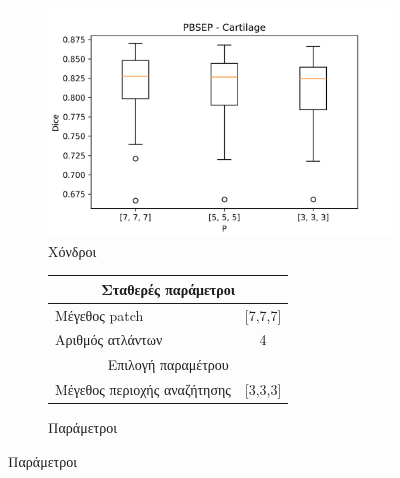 \documentclass{beamer}
\begin{document}
\begin{frame}
\begin{figure}[H]
    \begin{subfigure}[b]{0.42\linewidth}
    \includegraphics[width=\linewidth]{PBSEP_P_Cartilage_plot.png}
    \caption{Χόνδροι}
    \end{subfigure}
    \begin{subfigure}[b]{0.42\linewidth}
        \begin{tabular}[t]{|l|c|} 
            \multicolumn{2}{c}{\footnotesize Σταθερές παράμετροι} \\
            \hline
            \footnotesize Μέγεθος patch & \footnotesize [7,7,7] \\
            \hline
            \footnotesize Αριθμός ατλάντων & \footnotesize 4 \\ 
            \hline
            \multicolumn{2}{c}{\footnotesize Επιλογή παραμέτρου} \\
            \hline
            \footnotesize Μέγεθος περιοχής αναζήτησης & \footnotesize  [3,3,3] \\ 
            \hline
        \end{tabular}
    \caption{Παράμετροι}
    \end{subfigure}
\end{figure}

\end{frame}
\end{document}
